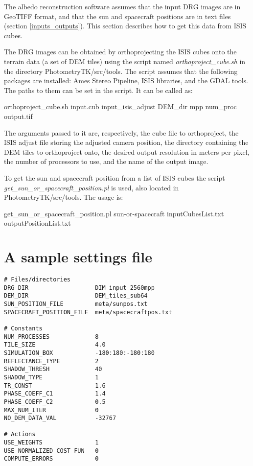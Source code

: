 \documentclass[letterpaper,fleqn,11pt]{report}
\renewcommand{\thesection}{\arabic{section}}
\begin{document}
The albedo reconstruction software assumes that the input DRG images are in GeoTIFF
format, and that the sun and spacecraft positions are in text files (section \ref{inputs_outputs}).
This section describes how to get this data from ISIS cubes.

The DRG images can be obtained by orthoprojecting the ISIS cubes 
onto the terrain data (a set of DEM tiles) using the script named {\it orthoproject\_cube.sh} in
the directory PhotometryTK/src/tools. The script assumes that the following packages
are installed: Ames Stereo Pipeline, ISIS libraries, and the GDAL
tools. The paths to them can be set in the script. It can be called
as:

orthoproject\_cube.sh input.cub input\_isis\_adjust DEM\_dir mpp num\_proc output.tif 

The arguments passed to it are, respectively, the cube file to
orthoproject, the ISIS adjust file storing the adjusted camera
position, the directory containing the DEM tiles to orthoproject onto, 
the desired output resolution in meters per pixel, the
number of processors to use, and the name of the output image.

To get the sun and spacecraft position from a list of ISIS cubes the
script {\it get\_sun\_or\_spacecraft\_position.pl} is used, also located in PhotometryTK/src/tools.
The usage is: 

get\_sun\_or\_spacecraft\_position.pl sun-or-spacecraft inputCubesList.txt outputPositionList.txt

\appendix

\renewcommand{\thesection}{A}

\section{A sample settings file}

\begin{verbatim}
# Files/directories
DRG_DIR                   DIM_input_2560mpp
DEM_DIR                   DEM_tiles_sub64
SUN_POSITION_FILE         meta/sunpos.txt
SPACECRAFT_POSITION_FILE  meta/spacecraftpos.txt

# Constants
NUM_PROCESSES             8
TILE_SIZE                 4.0
SIMULATION_BOX            -180:180:-180:180
REFLECTANCE_TYPE          2
SHADOW_THRESH             40
SHADOW_TYPE               1
TR_CONST                  1.6
PHASE_COEFF_C1            1.4
PHASE_COEFF_C2            0.5
MAX_NUM_ITER              0
NO_DEM_DATA_VAL           -32767

# Actions
USE_WEIGHTS               1
USE_NORMALIZED_COST_FUN   0
COMPUTE_ERRORS            0
\end{verbatim}



\end{document}
